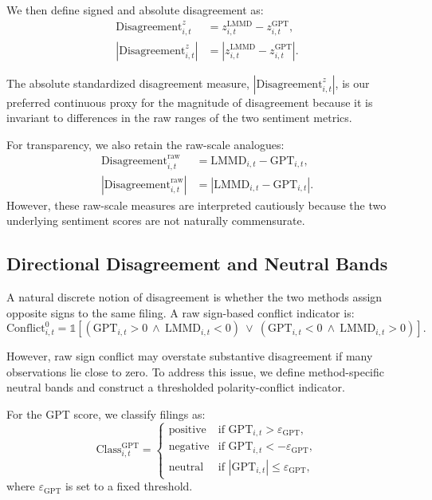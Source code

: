 We then define signed and absolute disagreement as:
\begin{align}
\text{Disagreement}^{z}_{i,t} &= z^{\text{LMMD}}_{i,t} - z^{\text{GPT}}_{i,t}, \\
\left| \text{Disagreement}^{z}_{i,t} \right| &= 
\left| z^{\text{LMMD}}_{i,t} - z^{\text{GPT}}_{i,t} \right|.
\end{align}

The absolute standardized disagreement measure,
$\left| \text{Disagreement}^{z}_{i,t} \right|$, is our preferred continuous
proxy for the magnitude of disagreement because it is invariant to differences
in the raw ranges of the two sentiment metrics.

For transparency, we also retain the raw-scale analogues:
\begin{align}
\text{Disagreement}^{\text{raw}}_{i,t} &= \text{LMMD}_{i,t} - \text{GPT}_{i,t}, \\
\left| \text{Disagreement}^{\text{raw}}_{i,t} \right| &=
\left| \text{LMMD}_{i,t} - \text{GPT}_{i,t} \right|.
\end{align}
However, these raw-scale measures are interpreted cautiously because the two
underlying sentiment scores are not naturally commensurate.

\subsection{Directional Disagreement and Neutral Bands}
\label{app:disagreement_directional}

A natural discrete notion of disagreement is whether the two methods assign
opposite signs to the same filing. A raw sign-based conflict indicator is:
\begin{equation}
\text{Conflict}^{0}_{i,t} =
\mathbb{1}\!\left[
\left( \text{GPT}_{i,t} > 0 \ \wedge \ \text{LMMD}_{i,t} < 0 \right)
\ \vee \
\left( \text{GPT}_{i,t} < 0 \ \wedge \ \text{LMMD}_{i,t} > 0 \right)
\right].
\end{equation}

However, raw sign conflict may overstate substantive disagreement if many
observations lie close to zero. To address this issue, we define method-specific
neutral bands and construct a thresholded polarity-conflict indicator.

For the GPT score, we classify filings as:
\begin{equation}
\text{Class}^{\text{GPT}}_{i,t} =
\begin{cases}
\text{positive} & \text{if } \text{GPT}_{i,t} > \varepsilon_{\text{GPT}}, \\
\text{negative} & \text{if } \text{GPT}_{i,t} < -\varepsilon_{\text{GPT}}, \\
\text{neutral}  & \text{if } |\text{GPT}_{i,t}| \le \varepsilon_{\text{GPT}},
\end{cases}
\end{equation}
where $\varepsilon_{\text{GPT}}$ is set to a fixed threshold.

